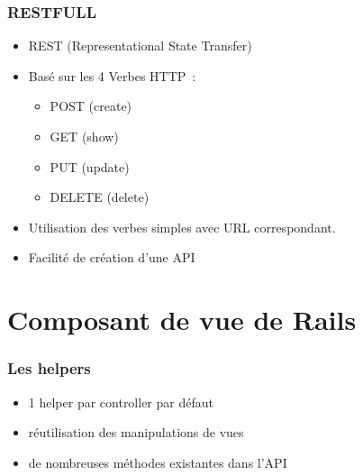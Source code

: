 \documentclass{beamer}
\begin{document}
\begin{frame}
    \frametitle{RESTFULL}

    \begin{itemize}
        \item REST (Representational State Transfer)
        \item Basé sur les 4 Verbes HTTP~:
            \begin{itemize}
                \item POST (create)
                \item GET (show)
                \item PUT (update)
                \item DELETE (delete)
            \end{itemize}
        \item Utilisation des verbes simples avec URL correspondant.
        \item Facilité de création d'une API
    \end{itemize}
\end{frame}

\section{Composant de vue de Rails}

\begin{frame}
    \frametitle{Les helpers}

    \begin{itemize}
        \item 1 helper par controller par défaut
        \item réutilisation des manipulations de vues
        \item de nombreuses méthodes existantes dans l'API
    \end{itemize}
\end{frame}
\end{document}
